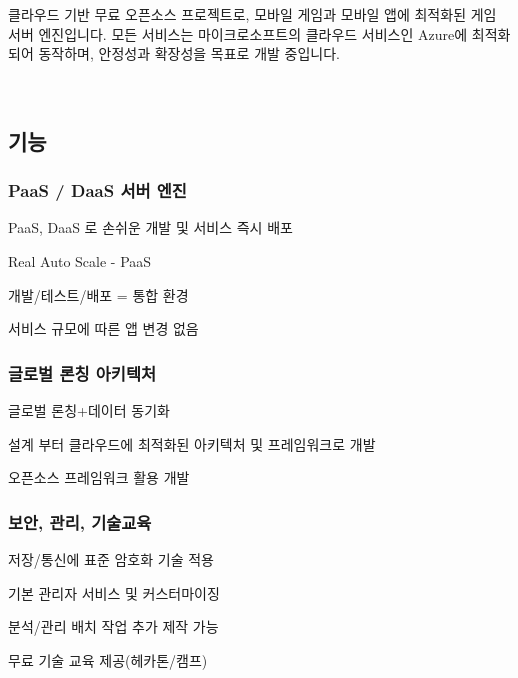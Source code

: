 클라우드 기반 무료 오픈소스 프로젝트로, 모바일 게임과 모바일 앱에 최적화된 게임 서버 엔진입니다. 모든 서비스는 마이크로소프트의 클라우드 서비스인 Azure에 최적화되어 동작하며, 안정성과 확장성을 목표로 개발 중입니다.

~\newline
 \subsection*{기능}

\subsubsection*{PaaS / DaaS 서버 엔진}


\begin{DoxyItemize}
\item PaaS, DaaS 로 손쉬운 개발 및 서비스 즉시 배포
\item Real Auto Scale -\/ PaaS
\item 개발/테스트/배포 = 통합 환경
\item 서비스 규모에 따른 앱 변경 없음
\end{DoxyItemize}

\subsubsection*{글로벌 론칭 아키텍처}


\begin{DoxyItemize}
\item 글로벌 론칭+데이터 동기화
\item 설계 부터 클라우드에 최적화된 아키텍처 및 프레임워크로 개발
\item 오픈소스 프레임워크 활용 개발
\end{DoxyItemize}

\subsubsection*{보안, 관리, 기술교육}


\begin{DoxyItemize}
\item 저장/통신에 표준 암호화 기술 적용
\item 기본 관리자 서비스 및 커스터마이징
\item 분석/관리 배치 작업 추가 제작 가능
\item 무료 기술 교육 제공(헤카톤/캠프)
\end{DoxyItemize}

